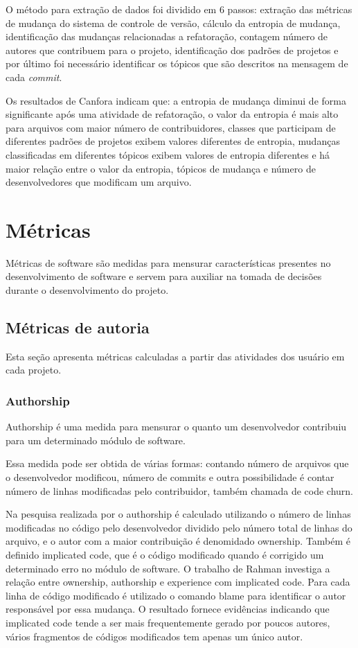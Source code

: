 O método para extração de dados foi dividido em 6 passos: extração das métricas de mudança do sistema de controle de versão, cálculo da entropia de mudança, identificação das mudanças relacionadas a refatoração, contagem número de autores que contribuem para o projeto, identificação dos padrões de projetos e por último foi necessário identificar os tópicos que são descritos na mensagem de cada \textit{commit}. 

Os resultados de Canfora indicam que: a entropia de mudança diminui de forma significante após uma atividade de refatoração, o valor da entropia é mais alto para arquivos com maior número de contribuidores, classes que participam de diferentes padrões de projetos exibem valores diferentes de entropia, mudanças classificadas em diferentes tópicos exibem valores de entropia diferentes e há maior relação entre o valor da entropia, tópicos de mudança e número de desenvolvedores que modificam um arquivo. 

\section{Métricas}
Métricas de software são medidas para mensurar características presentes no desenvolvimento de software e servem para auxiliar na tomada de decisões durante o desenvolvimento do projeto.

\subsection{Métricas de autoria}
Esta seção apresenta métricas calculadas a partir das atividades dos usuário em cada projeto.

\subsubsection{Authorship}
Authorship é uma medida para mensurar o quanto um desenvolvedor contribuiu para um determinado módulo de software.

Essa medida pode ser obtida de várias formas: contando número de arquivos que o desenvolvedor modificou, número de commits e outra possibilidade é contar número de linhas modificadas pelo contribuidor, também chamada de code churn\cite{Munson:1998:CCM:850947.853326}.

Na pesquisa realizada por  o authorship é calculado utilizando o número de linhas modificadas no código pelo desenvolvedor dividido pelo número total de linhas do arquivo, e o autor com a maior contribuição é denomidado ownership. Também é definido implicated code, que é o código modificado quando é corrigido um determinado erro no módulo de software. O trabalho de Rahman investiga a relação entre ownership, authorship e experience com implicated code. Para cada linha de código modificado é utilizado o comando blame para identificar o autor responsável por essa mudança. O resultado fornece evidências indicando que implicated code tende a ser mais frequentemente gerado por poucos autores, vários fragmentos de códigos modificados tem apenas um único autor.

